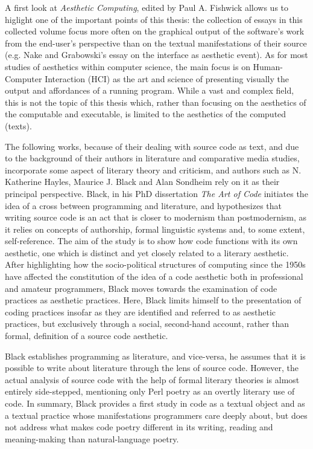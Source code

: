 A first look at \emph{Aesthetic Computing}, edited by Paul A. Fishwick allows us to higlight one of the important points of this thesis: the collection of essays in this collected volume focus more often on the graphical output of the software's work from the end-user's perspective than on the textual manifestations of their source (e.g. Nake and Grabowski's essay on the interface as aesthetic event)\cite{fishwick_aesthetic_2001}. As for most studies of aesthetics within computer science, the main focus is on Human-Computer Interaction (HCI) as the art and science of presenting visually the output and affordances of a running program. While a vast and complex field, this is not the topic of this thesis which, rather than focusing on the aesthetics of the computable and executable, is limited to the aesthetics of the computed (texts).

The following works, because of their dealing with source code as text, and due to the background of their authors in literature and comparative media studies, incorporate some aspect of literary theory and criticism, and authors such as N. Katherine Hayles, Maurice J. Black and Alan Sondheim rely on it as their principal perspective. Black, in his PhD dissertation \emph{The Art of Code}\cite{black_art_2002} initiates the idea of a cross between programming and literature, and hypothesizes that writing source code is an act that is closer to modernism than postmodernism, as it relies on concepts of authorship, formal linguistic systems and, to some extent, self-reference. The aim of the study is to show how code functions with its own aesthetic, one which is distinct and yet closely related to a literary aesthetic. After highlighting how the socio-political structures of computing since the 1950s have affected the constitution of the idea of a code aesthetic both in professional and amateur programmers, Black moves towards the examination of code practices as aesthetic practices. Here, Black limits himself to the presentation of coding practices insofar as they are identified and referred to as aesthetic practices, but exclusively through a social, second-hand account, rather than formal, definition of a source code aesthetic.

Black  establishes programming as literature, and vice-versa, he assumes that it is possible to write about literature through the lens of source code. However, the actual analysis of source code with the help of formal literary theories is almost entirely side-stepped, mentioning only Perl poetry as an overtly literary use of code. In summary, Black provides a first study in code as a textual object and as a textual practice whose manifestations programmers care deeply about, but does not address what makes code poetry different in its writing, reading and meaning-making than natural-language poetry.


